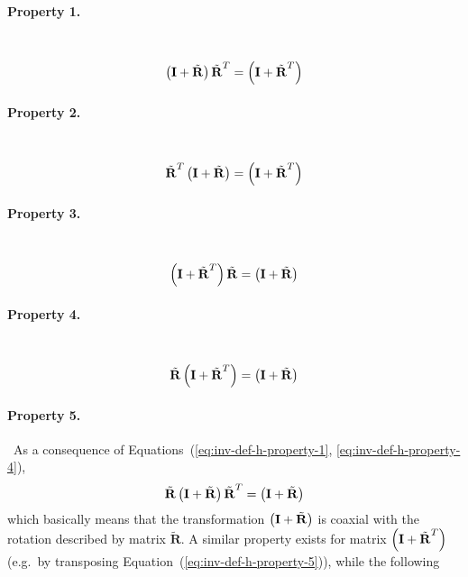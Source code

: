 \documentclass[10pt,dvips,fleqn,subeqn]{report}
\newcommand{\T}[1]{\bm{\mathbf{#1}}}
\begin{document}
\paragraph{Property 1.} \
\begin{equation}
	\plbr{\T{I} + \tilde{\T{R}}} \tilde{\T{R}}^T = \plbr{\T{I} + \tilde{\T{R}}^T}
	\label{eq:inv-def-h-property-1}
\end{equation}

\paragraph{Property 2.} \
\begin{equation}
	\tilde{\T{R}}^T \plbr{\T{I} + \tilde{\T{R}}} = \plbr{\T{I} + \tilde{\T{R}}^T}
	\label{eq:inv-def-h-property-2}
\end{equation}

\paragraph{Property 3.} \
\begin{equation}
	\plbr{\T{I} + \tilde{\T{R}}^T} \tilde{\T{R}} = \plbr{\T{I} + \tilde{\T{R}}}
	\label{eq:inv-def-h-property-3}
\end{equation}

\paragraph{Property 4.} \
\begin{equation}
	\tilde{\T{R}} \plbr{\T{I} + \tilde{\T{R}}^T} = \plbr{\T{I} + \tilde{\T{R}}}
	\label{eq:inv-def-h-property-4}
\end{equation}

\paragraph{Property 5.} \
As a consequence
of Equations~(\ref{eq:inv-def-h-property-1}, \ref{eq:inv-def-h-property-4}),
\begin{equation}
	\tilde{\T{R}} \plbr{\T{I} + \tilde{\T{R}}} \tilde{\T{R}}^T = \plbr{\T{I} + \tilde{\T{R}}}
	\label{eq:inv-def-h-property-5}
\end{equation}
which basically means that the transformation $\plbr{\T{I} + \tilde{\T{R}}}$
is coaxial with the rotation described by matrix $\tilde{\T{R}}$.
A similar property exists for matrix $\plbr{\T{I} + \tilde{\T{R}}^T}$
(e.g.\ by transposing Equation~(\ref{eq:inv-def-h-property-5})),
while the following
\end{document}
